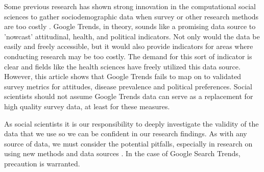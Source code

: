 Some previous research has shown strong innovation in the computational social sciences
to gather sociodemographic data when survey or other research methods are too costly
\citep{blumenstockPredictingPovertyWealth2015}. Google Trends, in theory, sounds like 
a promising data source to 'nowcast' attitudinal, health, and political indicators.
Not only would the data be easily and freely accessible, but it would also provide 
indicators for areas where conducting research may be too costly. The demand for this 
sort of indicator is clear and fields like the health sciences have freely utilized
this data source. However, this article shows that Google Trends
fails to map on to validated survey metrics for attitudes, disease prevalence and political preferences.
Social scientists should not assume Google Trends data can serve as a replacement
for high quality survey data, at least for these measures. 

As social scientists it is our responsibility to deeply investigate the validity 
of the data that we use so we can be confident in our research findings. As with any
source of data, we must consider the potential pitfalls, especially in research on 
using new methods and data sources \citep{mcfarlandBigDataDanger2015}.
In the case of Google Search Trends, precaution is warranted.




